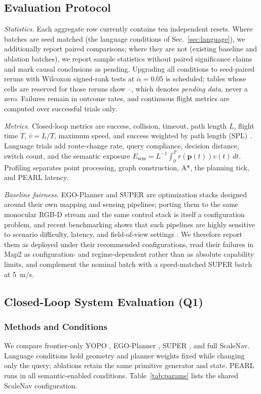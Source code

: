 \documentclass[letterpaper,10pt,conference]{ieeeconf}
\newcommand{\vect}[1]{\boldsymbol{#1}}
\newcommand{\blank}{--}
\begin{document}
\subsection{Evaluation Protocol}
\label{sec:protocol}
\emph{Statistics.}  Each aggregate row currently contains ten independent
resets.  Where batches are seed matched (the language conditions of
Sec.~\ref{sec:language}), we additionally report paired comparisons; where
they are not (existing baseline and ablation batches), we report sample
statistics without paired significance claims and mark causal conclusions as
pending.  Upgrading all conditions to seed-paired reruns with Wilcoxon
signed-rank tests at $\alpha=0.05$ is scheduled; tables whose cells are
reserved for those reruns show \blank{}, which denotes \emph{pending data},
never a zero.  Failures remain in outcome rates, and continuous flight
metrics are computed over successful trials only.

\emph{Metrics.}  Closed-loop metrics are success, collision, timeout, path
length $L$, flight time $T$, $\bar v=L/T$, maximum speed, and success
weighted by path length (SPL) \cite{anderson2018}.  Language trials add
route-change rate, query compliance, decision distance, switch count, and the
semantic exposure
$E_{\mathrm{sem}}=L^{-1}\int_0^T r(\vect{p}(t))v(t)\,dt$.
Profiling separates point processing, graph construction, A*, the planning
tick, and PEARL latency.

\emph{Baseline fairness.}  EGO-Planner \cite{egoplanner} and SUPER
\cite{super} are optimization stacks designed around their own mapping and
sensing pipelines; porting them to the same monocular RGB-D stream and the
same control stack is itself a configuration problem, and recent benchmarking
shows that such pipelines are highly sensitive to scenario difficulty,
latency, and field-of-view settings \cite{flightbench}.  We therefore report
them as deployed under their recommended configurations, read their failures
in Map2 as configuration- and regime-dependent rather than as absolute
capability limits, and complement the nominal batch with a speed-matched
SUPER batch at 5~m/s.

\subsection{Closed-Loop System Evaluation (Q1)}
\subsubsection{Methods and Conditions}
We compare frontier-only YOPO \cite{yopo}, EGO-Planner \cite{egoplanner},
SUPER \cite{super}, and full ScaleNav.  Language conditions hold geometry and
planner weights fixed while changing only the query; ablations retain the
same primitive generator and state.  PEARL \cite{pearl} runs in all
semantic-enabled conditions.  Table~\ref{tab:params} lists the shared
ScaleNav configuration.
\end{document}
